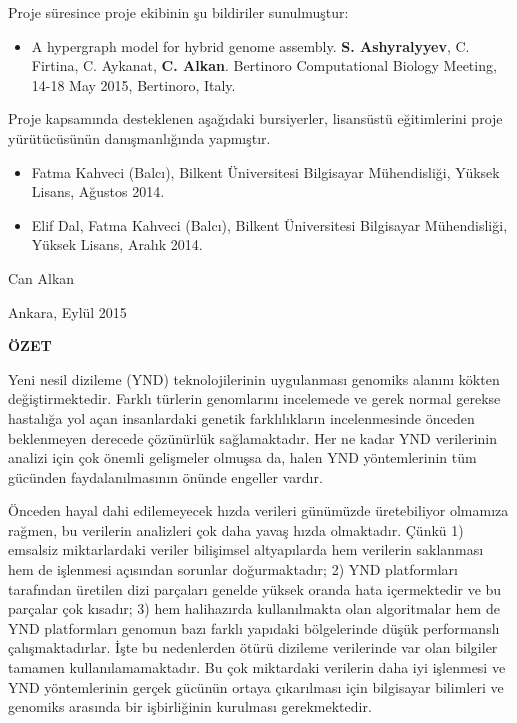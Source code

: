 \documentclass[11pt]{article}
\begin{document}
Proje süresince proje ekibinin şu bildiriler sunulmuştur:
 
\begin{itemize}
\item A hypergraph model for hybrid genome assembly. {\bf S. Ashyralyyev}, C. Firtina, C. Aykanat, {\bf C. Alkan}. Bertinoro Computational Biology Meeting, 14-18 May 2015, Bertinoro, Italy.

\end{itemize}

Proje kapsamında desteklenen aşağıdaki bursiyerler,  lisansüstü eğitimlerini 
proje yürütücüsünün danışmanlığında
yapmıştır.
 
\begin{itemize}
\item Fatma Kahveci (Balcı), Bilkent Üniversitesi Bilgisayar Mühendisliği, Yüksek Lisans, Ağustos 2014.
\item Elif Dal, Fatma Kahveci (Balcı), Bilkent Üniversitesi Bilgisayar Mühendisliği, Yüksek Lisans, Aralık 2014.
\end{itemize}


\bigskip
\hfill Can Alkan

\hfill Ankara, Eylül 2015
\newpage

\setlength{\parskip}{1mm} 

\tableofcontents


 



\newpage \setlength{\parskip}{3mm}
\phantom{ss}
\vspace{-2.5cm}

\begin{center}
{\bf \Large ÖZET} 
\end{center}
\noindent

Yeni nesil dizileme (YND) teknolojilerinin uygulanması genomiks alanını kökten değiştirmektedir. Farklı türlerin genomlarını incelemede ve gerek normal gerekse hastalığa yol açan insanlardaki genetik farklılıkların incelenmesinde önceden beklenmeyen derecede çözünürlük sağlamaktadır. Her ne kadar YND verilerinin analizi için çok önemli gelişmeler olmuşsa da, halen YND yöntemlerinin tüm gücünden faydalanılmasının önünde engeller vardır.

Önceden hayal dahi edilemeyecek hızda verileri günümüzde üretebiliyor olmamıza rağmen, bu verilerin analizleri çok daha yavaş hızda olmaktadır. Çünkü 1) emsalsiz miktarlardaki veriler bilişimsel altyapılarda hem verilerin saklanması hem de işlenmesi açısından sorunlar doğurmaktadır; 2) YND platformları tarafından üretilen dizi parçaları genelde yüksek oranda hata içermektedir ve bu parçalar çok kısadır; 3) hem halihazırda kullanılmakta olan algoritmalar hem de YND platformları genomun bazı farklı yapıdaki bölgelerinde düşük performanslı çalışmaktadırlar. İşte bu nedenlerden ötürü dizileme verilerinde var olan bilgiler tamamen kullanılamamaktadır. Bu çok miktardaki verilerin daha iyi işlenmesi ve YND yöntemlerinin gerçek gücünün ortaya çıkarılması için bilgisayar bilimleri ve genomiks arasında bir işbirliğinin kurulması gerekmektedir.
\end{document}
